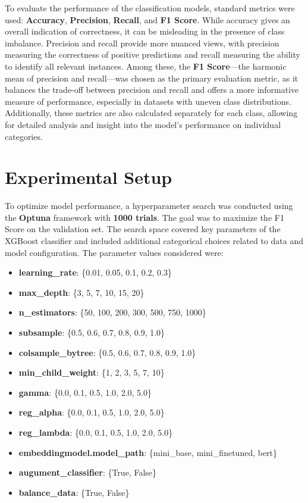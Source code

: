 \documentclass{SGGW-thesis-EN}
\begin{document}
To evaluate the performance of the classification models, standard metrics were used: \textbf{Accuracy}, \textbf{Precision}, \textbf{Recall}, and 
\textbf{F1 Score}. While accuracy gives an overall indication of correctness, it can be misleading in the presence of class imbalance. Precision and recall 
provide more nuanced views, with precision measuring the correctness of positive predictions and recall measuring the ability to identify all relevant 
instances. Among these, the \textbf{F1 Score}---the harmonic mean of precision and recall---was chosen as the primary evaluation metric, as it balances 
the trade-off between precision and recall and offers a more informative measure of performance, especially in datasets with uneven class distributions. 
Additionally, these metrics are also calculated separately for each class, allowing for detailed analysis and insight into the model’s performance on 
individual categories.


\section{Experimental Setup}

To optimize model performance, a hyperparameter search was conducted using the \textbf{Optuna} framework with \textbf{1000 trials}. 
The goal was to maximize the F1 Score on the validation set. The search space covered key parameters of the XGBoost classifier and 
included additional categorical choices related to data and model configuration. The parameter values considered were:

\begin{itemize}
    \item \textbf{learning\_rate}: \{0.01, 0.05, 0.1, 0.2, 0.3\}
    \item \textbf{max\_depth}: \{3, 5, 7, 10, 15, 20\}
    \item \textbf{n\_estimators}: \{50, 100, 200, 300, 500, 750, 1000\}
    \item \textbf{subsample}: \{0.5, 0.6, 0.7, 0.8, 0.9, 1.0\}
    \item \textbf{colsample\_bytree}: \{0.5, 0.6, 0.7, 0.8, 0.9, 1.0\}
    \item \textbf{min\_child\_weight}: \{1, 2, 3, 5, 7, 10\}
    \item \textbf{gamma}: \{0.0, 0.1, 0.5, 1.0, 2.0, 5.0\}
    \item \textbf{reg\_alpha}: \{0.0, 0.1, 0.5, 1.0, 2.0, 5.0\}
    \item \textbf{reg\_lambda}: \{0.0, 0.1, 0.5, 1.0, 2.0, 5.0\}
    \item \textbf{embeddingmodel.model\_path}: \{mini\_base, mini\_finetuned, bert\}
    \item \textbf{augument\_classifier}: \{True, False\}
    \item \textbf{balance\_data}: \{True, False\}
\end{itemize}
\end{document}
